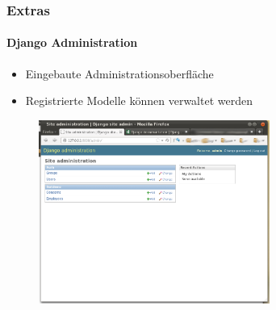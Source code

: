 \documentclass[
    t,
    smaller,
    compress,
    xcolor=svgnames,            %
    table,
]{beamer}
\begin{document}
\begin{frame}
  \frametitle{Extras}
  \framesubtitle{Django Administration}
  \begin{itemize}[<1->]
        \item Eingebaute Administrationsoberfläche
        \item Registrierte Modelle können verwaltet werden
  \end{itemize}
      \begin{figure}
         \includegraphics[height=60mm]{admin.png}

     \end{figure}

\end{frame}
\end{document}
